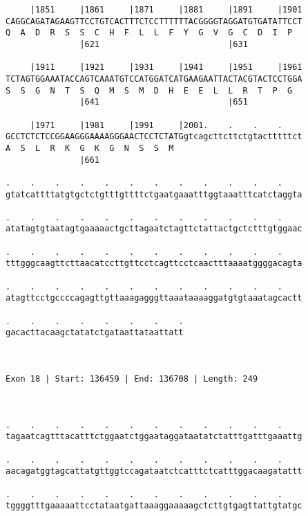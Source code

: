 \documentclass{article}
\begin{document}
\begin{Verbatim}
     |1851     |1861     |1871     |1881     |1891     |1901
CAGGCAGATAGAAGTTCCTGTCACTTTCTCCTTTTTTACGGGGTAGGATGTGATATTCCT
Q  A  D  R  S  S  C  H  F  L  L  F  Y  G  V  G  C  D  I  P  
               |621                          |631           
  
     |1911     |1921     |1931     |1941     |1951     |1961
TCTAGTGGAAATACCAGTCAAATGTCCATGGATCATGAAGAATTACTACGTACTCCTGGA
S  S  G  N  T  S  Q  M  S  M  D  H  E  E  L  L  R  T  P  G  
               |641                          |651           
  
     |1971     |1981     |1991     |2001.    .    .    .    
GCCTCTCTCCGGAAGGGAAAAGGGAACTCCTCTATGgtcagcttcttctgtactttttct
A  S  L  R  K  G  K  G  N  S  S  M                          
               |661                                         
  
.    .    .    .    .    .    .    .    .    .    .    .    
gtatcattttatgtgctctgtttgttttctgaatgaaatttggtaaatttcatctaggta
                                                            
.    .    .    .    .    .    .    .    .    .    .    .    
atatagtgtaatagtgaaaaactgcttagaatctagttctattactgctctttgtggaac
                                                            
.    .    .    .    .    .    .    .    .    .    .    .    
tttgggcaagttcttaacatccttgttcctcagttcctcaactttaaaatggggacagta
                                                            
.    .    .    .    .    .    .    .    .    .    .    .    
atagttcctgccccagagttgttaaagagggttaaataaaaggatgtgtaaatagcactt
                                                            
.    .    .    .    .    .    .    .
gacacttacaagctatatctgataattataattatt
                                    
                                    
 
Exon 18 | Start: 136459 | End: 136708 | Length: 249



.    .    .    .    .    .    .    .    .    .    .    .    
tagaatcagtttacatttctggaatctggaataggataatatctatttgatttgaaattg
                                                            
.    .    .    .    .    .    .    .    .    .    .    .    
aacagatggtagcattatgttggtccagataatctcatttctcatttggacaagatattt
                                                            
.    .    .    .    .    .    .    .    .    .    .    .    
tggggtttgaaaaattcctataatgattaaaggaaaaagctcttgtgagttattgtatgc
                                                            

\end{Verbatim}
\end{document}
